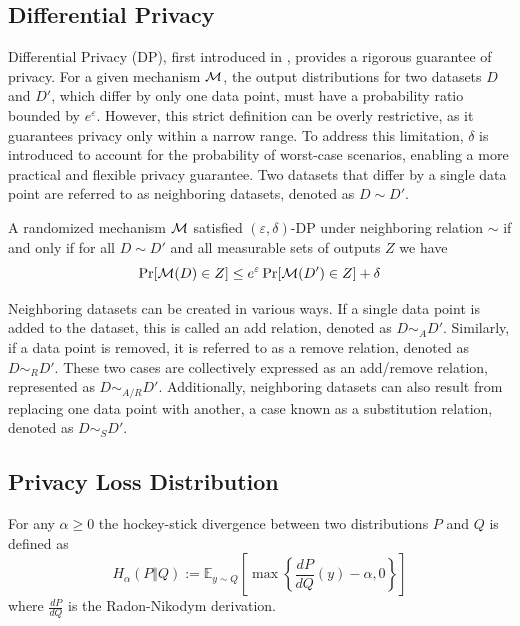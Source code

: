 \documentclass{article}
\begin{document}
\subsection{Differential Privacy}
Differential Privacy (DP), first introduced in \cite{dwork2006}, provides a rigorous guarantee of privacy. For a given mechanism ${\mathcal{M}}$, the output distributions for two datasets $D$ and $D'$, which differ by only one data point, must have a probability ratio bounded by $e^\varepsilon$. However, this strict definition can be overly restrictive, as it guarantees privacy only within a narrow range. To address this limitation, $\delta$ is introduced to account for the probability of worst-case scenarios, enabling a more practical and flexible privacy guarantee. Two datasets that differ by a single data point are referred to as neighboring datasets, denoted as $D\sim D'$.
\begin{definition}\label{DP}
A randomized mechanism ${\mathcal{M}}$ satisfied $(\varepsilon,\delta)$-DP under neighboring relation $\sim$ if and only if for all $D\sim D'$ and all measurable sets of outputs $Z$ we have 
\begin{equation*}
    \Pr[{\mathcal{M}}(D) \in Z] \le e^\varepsilon \Pr[{\mathcal{M}} (D') \in Z] + \delta
\end{equation*}    
\end{definition}
Neighboring datasets can be created in various ways. If a single data point is added to the dataset, this is called an add relation, denoted as $D \sim_A D'$. Similarly, if a data point is removed, it is referred to as a remove relation, denoted as $D \sim_R D'$. These two cases are collectively expressed as an add/remove relation, represented as $D \sim_{A/R} D'$. Additionally, neighboring datasets can also result from replacing one data point with another, a case known as a substitution relation, denoted as $D \sim_S D'$.

\subsection{Privacy Loss Distribution}

\begin{definition}
For any $\alpha \ge 0$ the hockey-stick divergence between two distributions $P$ and $Q$ is defined as 
\begin{equation*}
    H_\alpha (P \Vert Q) := \mathbb{E}_{y \sim Q} \left[\max \left\{ \frac{dP}{dQ}(y) - \alpha, 0 \right\} \right] 
\end{equation*}
where $\frac{dP}{dQ}$ is the Radon-Nikodym derivation.
\end{definition}
\end{document}
